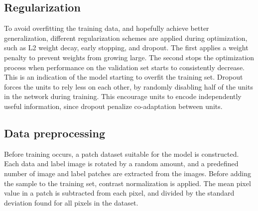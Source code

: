 \subsection{Regularization}
To avoid overfitting the training data, and hopefully achieve better generalization, different regularization schemes are applied during optimization, such as L2 weight decay, early stopping, and dropout. The first applies a weight penalty to prevent weights from growing large. The second stops the optimization process when performance on the validation set starts to consistently decrease. This is an indication of the model starting to overfit the training set. Dropout forces the units to rely less on each other, by randomly disabling half of the units in the network during training. This encourage units to encode independently useful information, since dropout penalize co-adaptation between units.\\


\subsection{Data preprocessing}

Before training occurs, a patch dataset suitable for the model is constructed. Each data and label image is rotated by a random amount, and a predefined number of image and label patches are extracted from the images. Before adding the sample to the training set, contrast normalization is applied. The mean pixel value in a patch is subtracted from each pixel, and divided by the standard deviation found for all pixels in the dataset.\\

